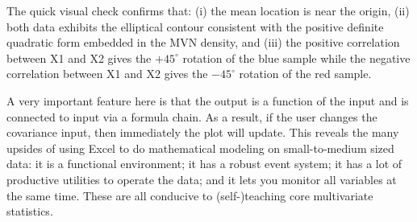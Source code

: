 \documentclass[article]{jss}
\numberwithin{equation}{subsection}
\begin{document}
        The quick visual check confirms that: (i) the mean location is near the origin, (ii) both data exhibits the elliptical contour consistent with the positive definite quadratic form embedded in the MVN density, and (iii) the positive correlation between X1 and X2 gives the $+45^\circ$ rotation of the blue sample while the negative correlation between X1 and X2 gives the $-45^\circ$ rotation of the red sample.
        
        A very important feature here is that the output is a function of the input and is connected to input via a formula chain. As a result, if the user changes the covariance input, then immediately the plot will update. This reveals the many upsides of using Excel to do mathematical modeling on small-to-medium sized data: it is a functional environment; it has a robust event system; it has a lot of productive utilities to operate the data; and it lets you monitor all variables at the same time. These are all conducive to (self-)teaching core multivariate statistics.
        
\end{document}
